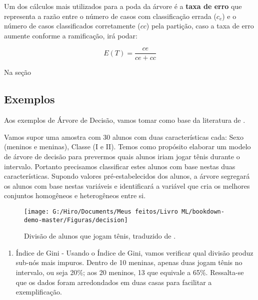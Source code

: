 \documentclass[
  openany]{book}
\providecommand{\tightlist}{%
  \setlength{\itemsep}{0pt}\setlength{\parskip}{0pt}}
\begin{document}
Um dos cálculos mais utilizados para a poda da árvore é a \textbf{taxa de erro} que representa a razão entre o número de casos com classificação errada (\(c_e\)) e o número de casos classificados corretamente (\(cc\)) pela partição, caso a taxa de erro aumente conforme a ramificação, irá podar:

\begin{equation}
E(T)=\frac{ce}{ce+cc}
\label{eq:txerro}
\end{equation}

Na seção

\hypertarget{extree}{%
\subsection{Exemplos}\label{extree}}

Aos exemplos de Árvore de Decisão, vamos tomar como base da literatura de \citep{analytics}.

Vamos supor uma amostra com 30 alunos com duas características cada: Sexo (meninos e meninas), Classe (I e II). Temos como propósito elaborar um modelo de árvore de decisão para prevermos quais alunos iriam jogar tênis durante o intervalo. Portanto precisamos classificar estes alunos com base nestas duas características. Supondo valores pré-estabelecidos dos alunos, a árvore segregará os alunos com base nestas variáveis e identificará a variável que cria os melhores conjuntos homogêneos e heterogêneos entre si.

\begin{figure}

{\centering \texttt{[image: G:/Hiro/Documents/Meus feitos/Livro ML/bookdown-demo-master/Figuras/decision]} 

}

\caption{Divisão de alunos que jogam tênis, traduzido de \citep{analytics}.}\label{fig:decision}
\end{figure}



\begin{enumerate}
\def\labelenumi{\arabic{enumi}.}
\tightlist
\item
  Índice de Gini - Usando o Índice de Gini, vamos verificar qual divisão produz sub-nós mais impuros. Dentro de 10 meninas, apenas duas jogam tênis no intervalo, ou seja 20\%; aos 20 meninos, 13 que equivale a 65\%. Ressalta-se que os dados foram arredondados em duas casas para facilitar a exemplificação.
\end{enumerate}
\end{document}
